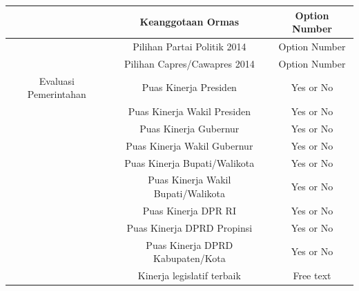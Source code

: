 \documentclass[letterpaper, 10 pt, conference]{ieeeconf}  %
\begin{document}
\begin{table}[h]
\begin{center}
\begin{tabular}{|c||c||c|}
\hline
& Keanggotaan Ormas & Option Number\\
\hline
& Pilihan Partai Politik 2014 & Option Number\\
\hline
& Pilihan Capres/Cawapres 2014 & Option Number\\
\hline
Evaluasi Pemerintahan & Puas Kinerja Presiden & Yes or No\\
\hline
 & Puas Kinerja Wakil Presiden & Yes or No\\
\hline
 & Puas Kinerja Gubernur & Yes or No\\
\hline
 & Puas Kinerja Wakil Gubernur & Yes or No\\
\hline
 & Puas Kinerja Bupati/Walikota & Yes or No\\
\hline
 & Puas Kinerja Wakil Bupati/Walikota & Yes or No\\
\hline
 & Puas Kinerja DPR RI & Yes or No\\
\hline
 & Puas Kinerja DPRD Propinsi & Yes or No\\
\hline
 & Puas Kinerja DPRD Kabupaten/Kota & Yes or No\\
\hline
 & Kinerja legislatif terbaik & Free text\\
\hline
\end{tabular}
\end{center}
\end{table}
\end{document}
